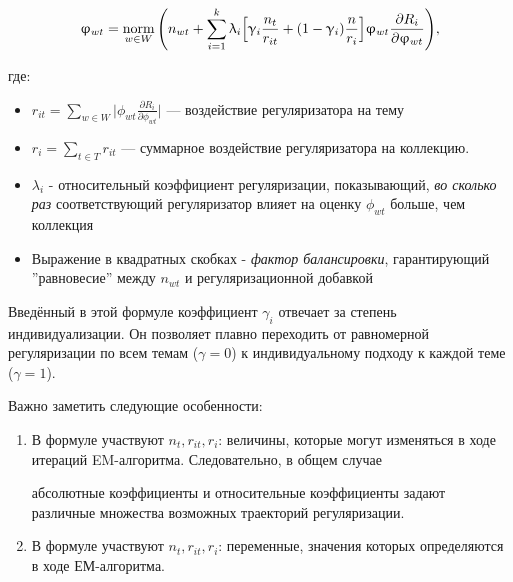 \[ 

\phi_{wt} = \norm_{w \in W}\Bigg(  

    n_{wt} + \sum_{i=1}^k \lambda_i \Big[ 

        \gamma_i \frac{n_t}{r_{it}} + (1-\gamma_i)\frac{n}{r_i} 

        \Big]  

    \phi_{wt} \frac{\partial R_i}{\partial \phi_{wt}} 

\Bigg), \label{rel_phi_general} 

\] 

 

где:  

\begin{itemize} 

    \item{$r_{it} = \sum_{w\in W} \Big| \phi_{wt} \frac{\partial R_i}{\partial \phi_{wt}} \Big| $ --- воздействие регуляризатора на тему} 

    \item { $r_{i} = \sum_{t\in T} r_{it}$ --- суммарное воздействие регуляризатора на коллекцию.} 

    \item { $\lambda_i$ - относительный коэффициент регуляризации, показывающий, \emph{во сколько раз} соответствующий регуляризатор влияет на оценку $\phi_{wt}$ больше, чем коллекция} 

    \item {Выражение в квадратных скобках - \textit{фактор балансировки}, гарантирующий ''равновесие'' между $n_{wt}$ и регуляризационной добавкой} 

\end{itemize} 

 

Введённый в этой формуле коэффициент $\gamma_i$ отвечает за степень индивидуализации. Он позволяет плавно переходить от равномерной регуляризации по всем темам ($\gamma = 0$) к индивидуальному подходу к каждой теме ($\gamma = 1$). 

 

Важно заметить следующие особенности:  

\begin{enumerate} 

    \item {В формуле участвуют $n_t, r_{it}, r_{i}$:  величины, которые могут изменяться в ходе итераций EM-алгоритма. Следовательно, в общем случае 

    абсолютные коэффициенты и относительные  коэффициенты задают различные множества возможных траекторий регуляризации.} 

    \item  {В формуле участвуют $n_t, r_{it}, r_{i}$: переменные, значения которых определяются в ходе ЕМ-алгоритма.} 

\end{enumerate} 

